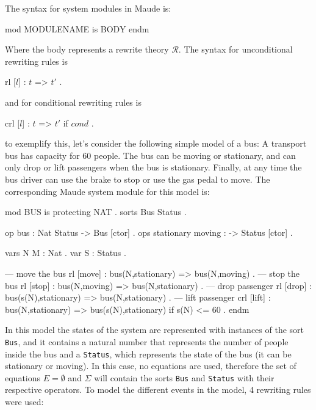 The syntax for system modules in Maude is:
\\
\begin{maude}
mod MODULENAME is
    BODY
endm
\end{maude}
Where the body represents a rewrite theory $\mathscr{R}$. The syntax for unconditional rewriting rules is
\\
\begin{maude}
rl [$l$] : $t$ => $t'$ .
\end{maude}
and for conditional rewriting rules is
\\
\begin{maude}
crl [$l$] : $t$ => $t'$ if $cond$ .
\end{maude}
to exemplify this, let's consider the following simple model of a bus: A transport bus has capacity for 60 people. The bus can be moving or stationary, and can only drop or lift passengers when the bus is stationary. Finally, at any time the bus driver can use the brake to stop or use the gas pedal to move. The corresponding Maude system module for this model is:
\\
\begin{maude}
mod BUS is protecting NAT .
  sorts Bus Status .

  op bus : Nat Status -> Bus [ctor] .
  ops stationary moving : -> Status [ctor] .
 
  vars N M : Nat . var S : Status .

  --- move the bus
  rl [move] : bus(N,stationary) => bus(N,moving) .
  --- stop the bus 
  rl [stop] : bus(N,moving) => bus(N,stationary) .
  --- drop passenger
  rl [drop] : bus(s(N),stationary) => bus(N,stationary) .
  --- lift passenger
  crl [lift] : bus(N,stationary) => bus(s(N),stationary) 
                                    if s(N) <= 60 . 
endm
\end{maude}
In this model the states of the system are represented with instances of the sort \texttt{Bus}, and it contains a natural number that represents the number of people inside the bus and a \texttt{Status}, which represents the state of the bus (it can be stationary or moving). In this case, no equations are used, therefore the set of equations $E = \emptyset$  and $\Sigma$ will contain the sorts \texttt{Bus} and \texttt{Status} with their respective operators. To model the different events in the model, 4 rewriting rules were used:
